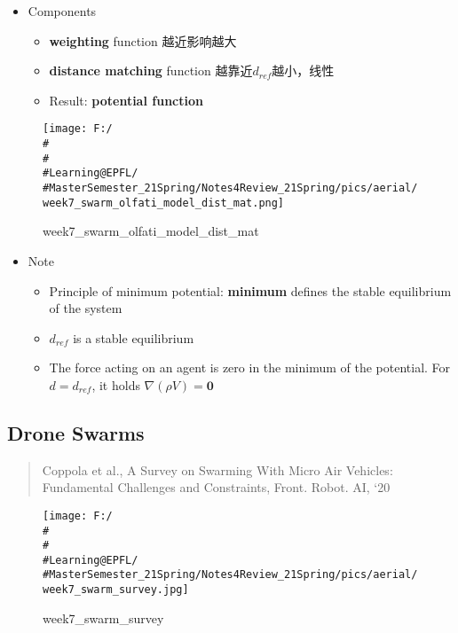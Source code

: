 \documentclass[]{article}
\begin{document}
\begin{itemize}
  \begin{itemize}
  \item
    Components

    \begin{itemize}
    \item
      \textbf{weighting} function 越近影响越大
    \item
      \textbf{distance matching} function 越靠近\(d_{ref}\)越小，线性
    \item
      Result: \textbf{potential function}
    \end{itemize}
  \end{itemize}

  \begin{figure}
  \centering
  \texttt{[image: F:/\\\#\\\#\\\#Learning@EPFL/\\\#MasterSemester\_21Spring/Notes4Review\_21Spring/pics/aerial/week7\_swarm\_olfati\_model\_dist\_mat.png]}
  \caption{week7\_swarm\_olfati\_model\_dist\_mat}
  \end{figure}

  \begin{itemize}
  \item
    Note

    \begin{itemize}
    \item
      Principle of minimum potential: \textbf{minimum} defines the
      stable equilibrium of the system
    \item
      \(d_{ref}\) is a stable equilibrium
    \item
      The force acting on an agent is zero in the minimum of the
      potential. For \(d=d_{ref}\), it holds
      \(\nabla(\rho V)=\mathbf{0}\)
    \end{itemize}
  \end{itemize}
\end{itemize}

\subsection{Drone Swarms}\label{header-n1440}

\begin{quote}
Coppola et al., A Survey on Swarming With Micro Air Vehicles:
Fundamental Challenges and Constraints, Front. Robot. AI, `20
\end{quote}

\begin{figure}
\centering
\texttt{[image: F:/\\\#\\\#\\\#Learning@EPFL/\\\#MasterSemester\_21Spring/Notes4Review\_21Spring/pics/aerial/week7\_swarm\_survey.jpg]}
\caption{week7\_swarm\_survey}
\end{figure}
\end{document}
